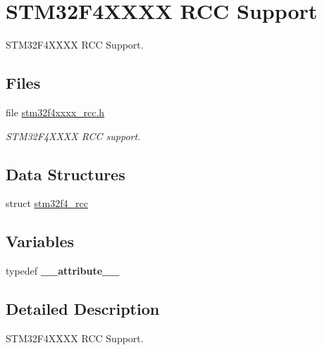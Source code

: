 \hypertarget{group__stm32f4xxxx__rcc}{}\section{S\+T\+M32\+F4\+X\+X\+XX R\+CC Support}
\label{group__stm32f4xxxx__rcc}


S\+T\+M32\+F4\+X\+X\+XX R\+CC Support.  


\subsection*{Files}
\begin{DoxyCompactItemize}
\item 
file \mbox{\hyperlink{stm32f4xxxx__rcc_8h}{stm32f4xxxx\+\_\+rcc.\+h}}
\begin{DoxyCompactList}\small\item\em S\+T\+M32\+F4\+X\+X\+XX R\+CC support. \end{DoxyCompactList}\end{DoxyCompactItemize}
\subsection*{Data Structures}
\begin{DoxyCompactItemize}
\item 
struct \mbox{\hyperlink{structstm32f4__rcc}{stm32f4\+\_\+rcc}}
\end{DoxyCompactItemize}
\subsection*{Variables}
\begin{DoxyCompactItemize}
\item 
\mbox{\label{group__stm32f4xxxx__rcc_gaeab68f17dc686a2f7dc72ab2b712e464}} 
typedef {\bfseries \+\_\+\+\_\+attribute\+\_\+\+\_\+}
\end{DoxyCompactItemize}


\subsection{Detailed Description}
S\+T\+M32\+F4\+X\+X\+XX R\+CC Support. 

